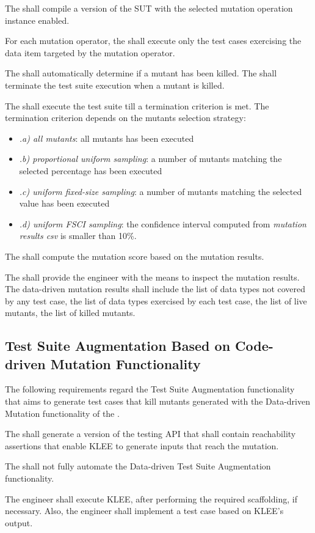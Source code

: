 \RQ{} The \FAQAS shall compile a version of the SUT with the selected mutation operation instance enabled.

\RQ{} For each mutation operator, the \FAQAS shall execute only the test cases exercising the data item targeted by the mutation operator.

\RQ{} The \FAQAS shall automatically determine if a mutant has been killed. The \FAQAS shall terminate the test suite execution when a mutant is killed.

\RQ{} The \FAQAS shall execute the test suite till a termination criterion is met. The termination criterion depends on the mutants selection strategy:
\begin{itemize}
\item \emph{.a) all mutants}: all mutants has been executed
\item \emph{.b) proportional uniform sampling}: a number of mutants matching the selected percentage has been executed
\item \emph{.c) uniform fixed-size sampling}: a number of mutants matching the selected value has been executed
\item \emph{.d) uniform FSCI sampling}: the confidence interval computed from \emph{mutation results csv} is smaller than 10\%.
\end{itemize}

\RQ{} The \FAQAS shall compute the mutation score based on the mutation results.

\RQ{} The \FAQAS shall provide the engineer with the means to inspect the mutation results. The \FAQAS data-driven mutation results shall include the list of data types not covered by any test case, the list of data types exercised by each test case, the list of live mutants, the list of killed mutants.


\subsection{Test Suite Augmentation Based on Code-driven Mutation Functionality}
\label{sec:codeDrivenAugmentation}

The following requirements regard the Test Suite Augmentation functionality that aims to generate test cases that kill mutants generated with the Data-driven Mutation functionality of the \FAQAS.

\RQ{} The \FAQAS shall generate a version of the testing API that shall contain reachability assertions that enable KLEE to generate inputs that reach the mutation.

\RQ{} The \FAQAS shall not fully automate the Data-driven Test Suite Augmentation functionality.

\remark The engineer shall execute KLEE, after performing the required scaffolding, if necessary. 
Also, the engineer shall implement a test case based on KLEE's output.
